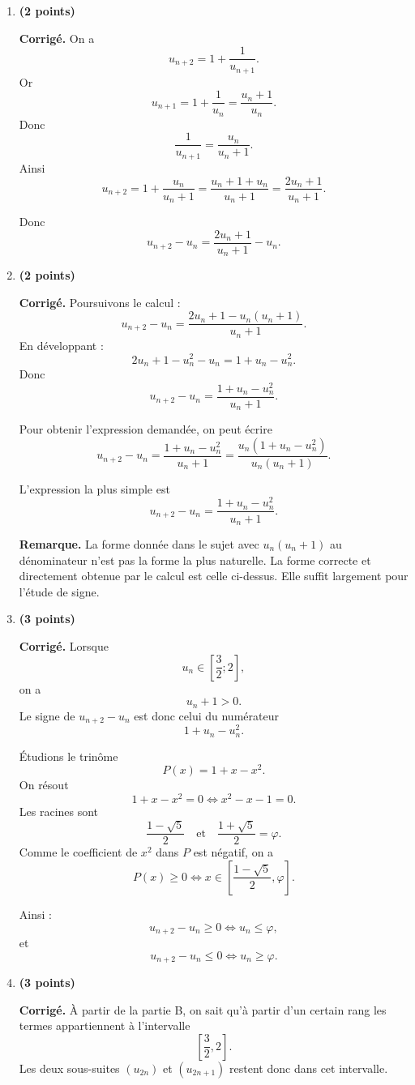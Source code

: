 \documentclass[11pt,a4paper]{article}
\newcommand{\bareme}[1]{\hfill{\color{blue!70!black}\textbf{(#1 points)}}}
\newcommand{\corr}{\noindent\textcolor{blue!70!black}{\textbf{Corrigé. }}}
\newcommand{\rem}{\noindent\textcolor{red!70!black}{\textbf{Remarque. }}}
\begin{document}
\begin{enumerate}[label=\textbf{C.\arabic*.}, leftmargin=0.9cm]

\item \bareme{2}

\corr On a
\[
u_{n+2}=1+\frac1{u_{n+1}}.
\]
Or
\[
u_{n+1}=1+\frac1{u_n}=\frac{u_n+1}{u_n}.
\]
Donc
\[
\frac1{u_{n+1}}=\frac{u_n}{u_n+1}.
\]
Ainsi
\[
u_{n+2}=1+\frac{u_n}{u_n+1}=\frac{u_n+1+u_n}{u_n+1}=\frac{2u_n+1}{u_n+1}.
\]

Donc
\[
u_{n+2}-u_n=\frac{2u_n+1}{u_n+1}-u_n.
\]

\item \bareme{2}

\corr Poursuivons le calcul :
\[
u_{n+2}-u_n=\frac{2u_n+1-u_n(u_n+1)}{u_n+1}.
\]
En développant :
\[
2u_n+1-u_n^2-u_n=1+u_n-u_n^2.
\]
Donc
\[
u_{n+2}-u_n=\frac{1+u_n-u_n^2}{u_n+1}.
\]

Pour obtenir l’expression demandée, on peut écrire
\[
u_{n+2}-u_n=\frac{1+u_n-u_n^2}{u_n+1}
=
\frac{u_n(1+u_n-u_n^2)}{u_n(u_n+1)}.
\]

L’expression la plus simple est
\[
\boxed{u_{n+2}-u_n=\frac{1+u_n-u_n^2}{u_n+1}.}
\]

\rem La forme donnée dans le sujet avec $u_n(u_n+1)$ au dénominateur n’est pas la forme la plus naturelle. La forme correcte et directement obtenue par le calcul est celle ci-dessus. Elle suffit largement pour l’étude de signe.

\item \bareme{3}

\corr Lorsque
\[
u_n\in\left[\frac32;2\right],
\]
on a
\[
u_n+1>0.
\]
Le signe de $u_{n+2}-u_n$ est donc celui du numérateur
\[
1+u_n-u_n^2.
\]

Étudions le trinôme
\[
P(x)=1+x-x^2.
\]
On résout
\[
1+x-x^2=0
\iff
x^2-x-1=0.
\]
Les racines sont
\[
\frac{1-\sqrt5}{2}
\quad \text{et} \quad
\frac{1+\sqrt5}{2}=\varphi.
\]
Comme le coefficient de $x^2$ dans $P$ est négatif, on a
\[
P(x)\geq 0 \iff x\in\left[\frac{1-\sqrt5}{2},\varphi\right].
\]

Ainsi :
\[
u_{n+2}-u_n\geq 0 \iff u_n\leq \varphi,
\]
et
\[
u_{n+2}-u_n\leq 0 \iff u_n\geq \varphi.
\]

\item \bareme{3}

\corr À partir de la partie B, on sait qu’à partir d’un certain rang les termes appartiennent à l’intervalle
\[
\left[\frac32,2\right].
\]
Les deux sous-suites $(u_{2n})$ et $(u_{2n+1})$ restent donc dans cet intervalle.


\end{enumerate}
\end{document}

